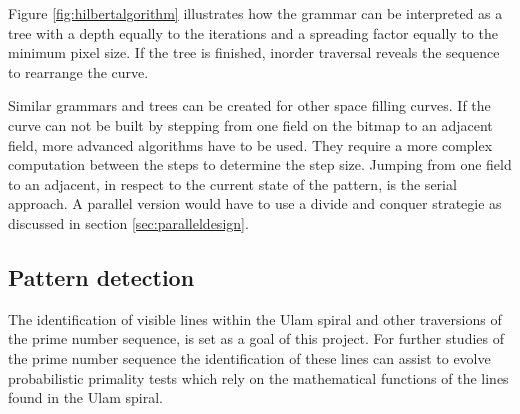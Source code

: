 
Figure \ref{fig:hilbertalgorithm} illustrates how the grammar can be interpreted as a tree with a depth equally to the iterations and a spreading factor equally to the minimum pixel size. If the tree is finished, inorder traversal reveals the sequence to rearrange the curve. 


Similar grammars and trees can be created for other space filling curves. If the curve can not be built by stepping from one field on the bitmap to an adjacent field, more advanced algorithms have to be used. They require a more complex computation between the steps to determine the step size. Jumping from one field to an adjacent, in respect to the current state of the pattern, is the serial approach. A parallel version would have to use a divide and conquer strategie as discussed in section \ref{sec:paralleldesign}.

\subsection{Pattern detection}
\label{sec:pattern}
The identification of visible lines within the Ulam spiral and other traversions of the prime number sequence, is set as a goal of this project. For further studies of the prime number sequence the identification of these lines can assist to evolve probabilistic primality tests which rely on the mathematical functions of the lines found in the Ulam spiral.

